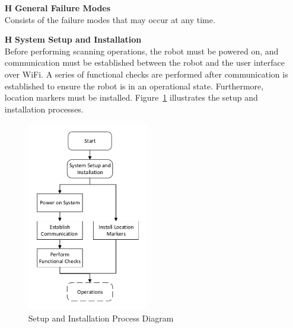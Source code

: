 \documentclass[12pt]{article}
\newcounter{haznum} %
\begin{document}
\noindent \begin{itemize}
\item[\textbf{H\thehaznum \label{H0}}] \textbf{General Failure Modes}\\
Consists of the failure modes that may occur at any time. 

\item[\textbf{H\refstepcounter{haznum}\thehaznum \label{H1}}] \textbf{System Setup and Installation}\\
Before performing scanning operations, the robot must be powered on, and communication must be established between the robot and the user interface over WiFi. A series of functional checks are performed after communication is established to ensure the robot is in an operational state. Furthermore, location markers must be installed. Figure~\ref{fig_Setup} illustrates the setup and installation processes.
\begin{figure}[H]
\centering 
\includegraphics[width=0.5\textwidth]{Figures/Setup Processes.pdf}
\caption{Setup and Installation Process Diagram}
\label{fig_Setup}
\end{figure}


\end{itemize}
\end{document}
